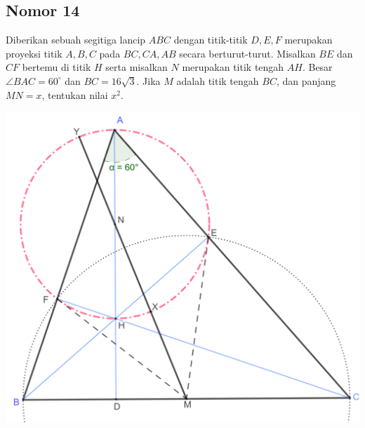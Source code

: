 \documentclass[12pt]{scrartcl}
\begin{document}
\newpage
\subsection{Nomor 14}
Diberikan sebuah segitiga lancip $ABC$ dengan titik-titik $D,E,F$ merupakan proyeksi titik $A,B,C$ pada $BC,CA,AB$ secara berturut-turut. Misalkan $BE$ dan $CF$ bertemu di titik $H$ serta misalkan $N$ merupakan titik tengah $AH$. Besar$\angle BAC = 60^\circ$ dan $BC=16\sqrt{3}$. Jika $M$ adalah titik tengah $BC$, dan panjang $MN = x$, tentukan nilai $x^2$.

\begin{center}
\includegraphics[scale=1.5]{nomor 14 rev.png}
\end{center}
\end{document}
